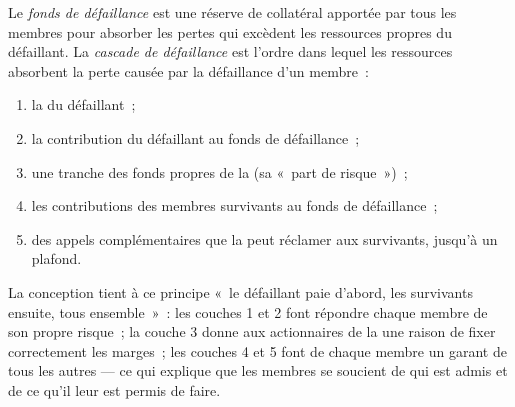 \begin{definition}\label{def:m1:clearing-and-settlement:waterfall}
Le \emph{fonds de défaillance} est une réserve de collatéral
apportée par tous les membres pour absorber les pertes qui excèdent les ressources propres
du défaillant. La \emph{cascade de défaillance} est l'ordre
dans lequel les ressources absorbent la perte causée par la défaillance d'un membre~:
\begin{enumerate}
\item la  du défaillant~;
\item la contribution du défaillant au fonds de défaillance~;
\item une tranche des fonds propres de la  (sa «~part de risque~»)~;
\item les contributions des membres survivants au fonds de défaillance~;
\item des appels complémentaires que la  peut réclamer aux survivants, jusqu'à un plafond.
\end{enumerate}
\end{definition}

La conception tient à ce principe «~le défaillant paie d'abord, les survivants ensuite, tous ensemble~»~: les
couches 1 et 2 font répondre chaque membre de son propre risque~; la couche 3 donne aux
actionnaires de la  une raison de fixer correctement les marges~; les couches 4 et 5 font de chaque membre un
garant de tous les autres --- ce qui explique que les membres se soucient de qui est admis
et de ce qu'il leur est permis de faire.

